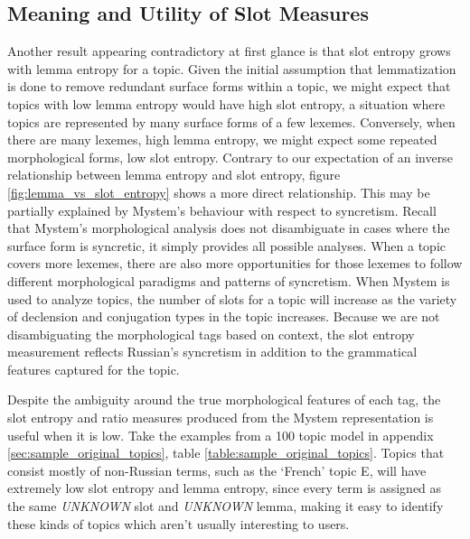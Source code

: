 \documentclass[11pt,a4paper]{article}
\begin{document}
\subsection{Meaning and Utility of Slot Measures}
\label{sec:slot_meaning}
Another result appearing contradictory at first glance is that slot entropy grows with lemma entropy for a topic. Given the initial assumption that lemmatization is done to remove redundant surface forms within a topic, we might expect that topics with low lemma entropy would have high slot entropy, a situation where topics are represented by many surface forms of a few lexemes. Conversely, when there are many lexemes, high lemma entropy, we might expect some repeated morphological forms, low slot entropy. Contrary to our expectation of an inverse relationship between lemma entropy and slot entropy, figure \ref{fig:lemma_vs_slot_entropy} shows a more direct relationship. This may be partially explained by Mystem's behaviour with respect to syncretism. Recall that Mystem's morphological analysis does not disambiguate in cases where the surface form is syncretic, it simply provides all possible analyses. When a topic covers more lexemes, there are also more opportunities for those lexemes to follow different morphological paradigms and patterns of syncretism. When Mystem is used to analyze topics, the number of slots for a topic will increase as the variety of declension and conjugation types in the topic increases. Because we are not disambiguating the morphological tags based on context, the slot entropy measurement reflects Russian's syncretism in addition to the grammatical features captured for the topic.

Despite the ambiguity around the true morphological features of each tag, the slot entropy and ratio measures produced from the Mystem representation is useful when it is low. Take the examples from a 100 topic model in appendix \ref{sec:sample_original_topics}, table \ref{table:sample_original_topics}. Topics that consist mostly of non-Russian terms, such as the `French' topic E, will have extremely low slot entropy and lemma entropy, since every term is assigned as the same \textit{UNKNOWN} slot and \textit{UNKNOWN} lemma, making it easy to identify these kinds of topics which aren't usually interesting to users.
\end{document}

